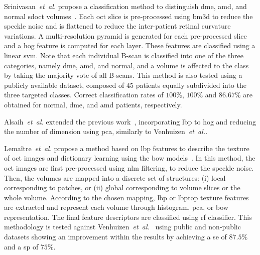 %
Srinivasan~\textit{et~al.} propose a classification method to distinguish \gls{dme}, \gls{amd}, and normal \gls{sdoct} volumes~\cite{Srinivasan2014}.
%
Each \gls{oct} slice is pre-processed using \gls{bm3d} to reduce the speckle noise and is flattened to reduce the inter-patient retinal curvature variations.
A multi-resolution pyramid is generated for each pre-processed slice and a \gls{hog} feature is computed for each layer.
These features are classified using a linear \gls{svm}.
Note that each individual B-scan is classified into one of the three categories, namely \gls{dme}, \gls{amd}, and normal, and a volume is affected to the class by taking the majority vote of all B-scans.
%
This method is also tested using a publicly available dataset, composed of $45$ patients equally subdivided into the three targeted classes.
Correct classification rates of $100 \%$, $100 \%$ and $86.67 \%$ are obtained for normal, \gls{dme}, and \gls{amd} patients, respectively.

Alsaih~\emph{et~al.} extended the previous work~\cite{Alsaih2016apr-repoICPR}, incorporating \gls{lbp} to \gls{hog} and reducing the number of dimension using \gls{pca}, similarly to Venhuizen~\textit{et~al.}.

Lema\^itre~\emph{et~al.} propose a method based on \gls{lbp} features to describe the texture of \gls{oct} images and dictionary learning using the \gls{bow} models~\cite{Lemaintre2015miccaiOCT}.
In this method, the \gls{oct} images are first pre-processed using \gls{nlm} filtering, to reduce the speckle noise.
Then, the volumes are mapped into a discrete set of structures: (i) local corresponding to patches, or (ii) global corresponding to volume slices or the whole volume.
According to the chosen mapping, \gls{lbp} or \gls{lbptop} texture features are extracted and represent each volume through histogram, \gls{pca}, or \gls{bow} representation.
The final feature descriptors are classified using \gls{rf} classifier.
This methodology is tested against Venhuizen~\textit{et~al.}~\cite{Venhuizen2015} using public and non-public datasets showing an improvement within the results by achieving a \gls{se} of $87.5 \%$ and a \gls{sp} of $75 \%$.

